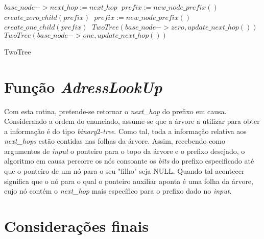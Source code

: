 \documentclass[twocolumn]{article}
\begin{document}
\begin{algorithmic}
 		\State $base\_node->next\_hop:=next\_hop\;$
 	\EndIf
 \Else
 		\State $prefix:=new\_node\_prefix()\;$
 		\State $create\_zero\_child(prefix)\;$
 	\Else
			\State $prefix:=new\_node\_prefix()\;$
			\State $create\_one\_child(prefix)\;$
		\EndIf
 	\EndIf
 	\State $TwoTree(base\_node->zero, update\_next\_hop())\;$
 	\State $TwoTree(base\_node->one, update\_next\_hop())\;$
 \EndIf
 
 \Return\;
 \caption{TwoTree}
\end{algorithmic}

\section{Função \textit{AdressLookUp}}
Com esta rotina, pretende-se retornar o \textit{next\_hop} do prefixo em causa. Considerando a ordem do enunciado, assume-se que a árvore a utilizar para obter a informação é do tipo \textit{binary}2-\textit{tree}. Como tal, toda a informação relativa aos \textit{next\_hops} estão contidas nas folhas da árvore. Assim, recebendo como argumentos de \textit{input} o ponteiro para o topo da árvore e o prefixo desejado, o algoritmo em causa percorre os nós consoante os \textit{bits} do prefixo especificado até que o ponteiro de um nó para o seu "filho" seja NULL. Quando tal acontecer significa que o nó para o qual o ponteiro auxiliar aponta é uma folha da árvore, cujo nó contém o \textit{next\_hop} mais específico para o prefixo dado no \textit{input}.

\begin{algorithmic}
 	\Return $-1\;$
 \EndIf
 
 \State $auxiliar:=root\;$
 
 		\If{$has\_no\_"0"\_child$}{
 			\Return $auxiliar->next\_hop\;$
 		\EndIf
 		\State $auxiliar:=auxiliar->zero\;$
 	\Else
 		\If{$has\_no\_"1"\_child$}
 			\Return $auxiliar->next\_hop\;$
 		\EndIf
 		\State $auxiliar:=auxiliar->one\;$
 	\EndIf
 \EndWhile
 
 \Return -1\;
 \caption{AdressLookUp}
\end{algorithmic}
\section{Considerações finais}
\end{document}
